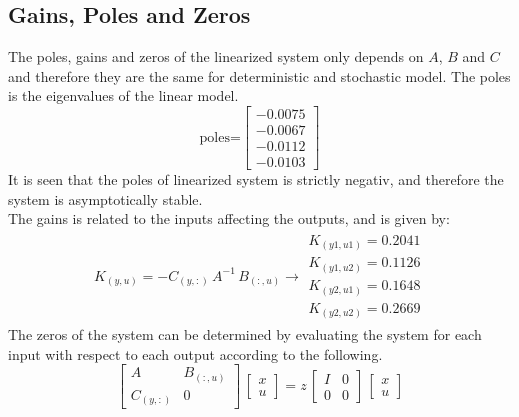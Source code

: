 \subsection{Gains, Poles and Zeros}
The poles, gains and zeros of the linearized system only depends on $A$, $B$ and $C$ and therefore they are the same for deterministic and stochastic model. The poles is the eigenvalues of the linear model.
\begin{equation}
\text{poles=}
    \begin{bmatrix}
        -0.0075 \\ -0.0067 \\ -0.0112 \\ -0.0103
    \end{bmatrix}
\end{equation}
It is seen that the poles of linearized system is strictly negativ, and therefore the system is asymptotically stable.\\
The gains is related to the inputs affecting the outputs, and is given by:
\begin{equation}
    \begin{matrix}
        K_{(y,u)}=-C_{(y,:)}\,A^{-1}\,B_{(:,u)}\xrightarrow{}
        \begin{gathered}
            K_{(y1,u1)}=0.2041 \\
            K_{(y1,u2)}=0.1126 \\
            K_{(y2,u1)}=0.1648 \\
            K_{(y2,u2)}=0.2669
        \end{gathered}
    \end{matrix}
\end{equation}
The zeros of the system can be determined by evaluating the system for each input with respect to each output according to the following.
\begin{equation}
        \begin{bmatrix}
            A & B_{(:,u)} \\ C_{(y,:)} & 0
        \end{bmatrix}\,
        \begin{bmatrix}
            x \\ u
        \end{bmatrix} = z\,
        \begin{bmatrix}
            I & 0 \\ 0 & 0
        \end{bmatrix}\,
        \begin{bmatrix}
            x \\ u
        \end{bmatrix}
\end{equation}
